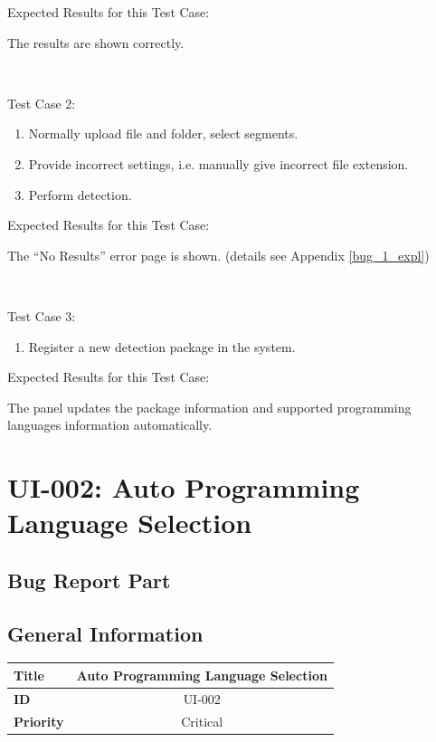 \documentclass[twoside,a4paper]{refart}
\newcommand{\bugsecond}{UI-002: Auto Programming Language Selection}
\begin{document}
Expected Results for this Test Case: 

The results are shown correctly.

$\ $

Test Case 2:

\begin{enumerate}
\item Normally upload file and folder, select segments.
\item Provide incorrect settings, i.e. manually give incorrect file extension.
\item Perform detection.
\end{enumerate}

Expected Results for this Test Case: 

The \enquote{No Results} error page is shown. (details see Appendix \ref{bug_1_expl})

$\ $

Test Case 3:

\begin{enumerate}
\item Register a new detection package in the system.
\end{enumerate}

Expected Results for this Test Case: 

The panel updates the package information and supported programming languages information automatically.

\section{\bugsecond}
\subsection{Bug Report Part}

\subsection*{General Information}
\begin{table}[!h]
\begin{tabular}{|l|c|}
\hline
\textbf{Title} & Auto Programming Language Selection \\ \hline
\textbf{ID} & UI-002 \\ \hline
\textbf{Priority} & Critical \\ \hline
\end{tabular}
\end{table}
\end{document}
